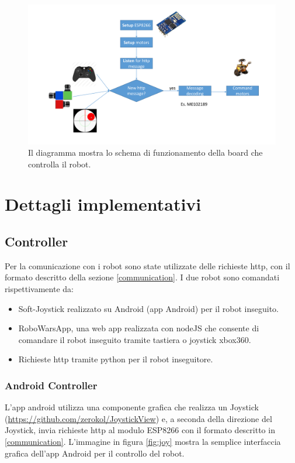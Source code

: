 \documentclass [11pt ,a4paper ,twoside ]{article}
\begin{document}
\begin{figure}
	\centering
		\hspace*{-4.9cm}\includegraphics[width=1.7\textwidth]{Images/img.pdf}
		\caption{Il diagramma mostra lo schema di funzionamento della board che controlla il robot.}
	\label{fig:img}
\end{figure}

\section{Dettagli implementativi}

\subsection{Controller}

Per la comunicazione con i robot sono state utilizzate delle richieste http, con il formato descritto della sezione \ref{communication}. I due robot sono comandati rispettivamente da:	
\begin{itemize}
\item Soft-Joystick realizzato su Android (app Android) per il robot inseguito.
\item RoboWarsApp, una web app realizzata con nodeJS che consente di comandare il robot inseguito tramite tastiera o joystick xbox360.
\item Richieste http tramite python per il robot inseguitore.
\end{itemize}

\subsubsection{Android Controller}
L'app android utilizza una componente grafica che realizza un Joystick (\url{https://github.com/zerokol/JoystickView}) e, a seconda della direzione del Joystick, invia richieste http al modulo ESP8266 con il formato descritto in \ref{communication}. L'immagine in figura \ref{fig:joy} mostra la semplice interfaccia grafica dell'app Android per il controllo del robot.
\end{document}
